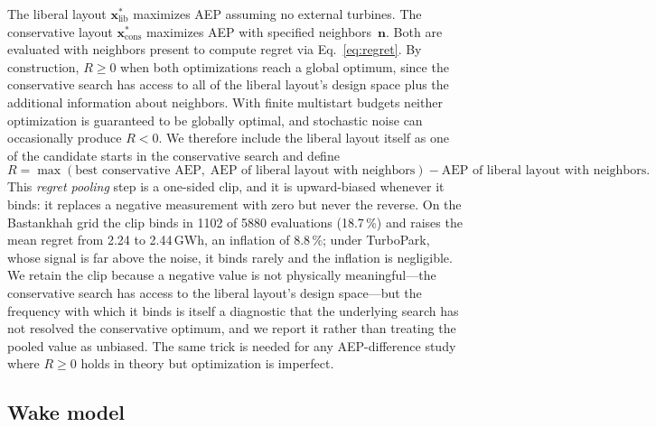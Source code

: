 \documentclass[wes, manuscript]{copernicus}
\begin{document}
The liberal layout $\mathbf{x}^*_\text{lib}$ maximizes AEP assuming no external turbines.
The conservative layout $\mathbf{x}^*_\text{cons}$ maximizes AEP with specified neighbors~$\mathbf{n}$.
Both are evaluated with neighbors present to compute regret via Eq.~\eqref{eq:regret}.
By construction, $R \geq 0$ when both optimizations reach a global optimum, since the conservative search has access to all of the liberal layout's design space plus the additional information about neighbors.
With finite multistart budgets neither optimization is guaranteed to be globally optimal, and stochastic noise can occasionally produce $R < 0$.
We therefore include the liberal layout itself as one of the candidate starts in the conservative search and define
\begin{equation}\label{eq:pooling}
    R = \max(\text{best conservative AEP},\; \text{AEP of liberal layout with neighbors}) - \text{AEP of liberal layout with neighbors}.
\end{equation}
This \emph{regret pooling} step is a one-sided clip, and it is upward-biased whenever it binds: it replaces a negative measurement with zero but never the reverse.
On the Bastankhah grid the clip binds in 1102 of 5880 evaluations (18.7\,\%) and raises the mean regret from 2.24 to 2.44\,GWh, an inflation of 8.8\,\%; under TurboPark, whose signal is far above the noise, it binds rarely and the inflation is negligible.
We retain the clip because a negative value is not physically meaningful---the conservative search has access to the liberal layout's design space---but the frequency with which it binds is itself a diagnostic that the underlying search has not resolved the conservative optimum, and we report it rather than treating the pooled value as unbiased.
The same trick is needed for any AEP-difference study where $R \geq 0$ holds in theory but optimization is imperfect.

\subsection{Wake model}\label{sec:methods-wake}
\end{document}
